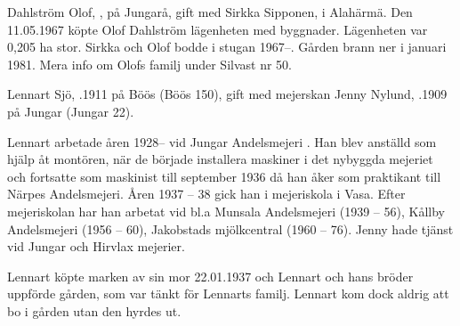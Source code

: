 Dahlström Olof, , på Jungarå, gift med Sirkka Sipponen,  i Alahärmä. Den 11.05.1967 köpte Olof Dahlström lägenheten med byggnader. Lägenheten var 0,205 ha stor. Sirkka och Olof bodde i stugan 1967--. Gården brann ner i januari 1981. Mera info om Olofs familj under Silvast nr 50.


Lennart Sjö, .1911 på Böös (Böös 150), gift med mejerskan Jenny Nylund, .1909 på Jungar (Jungar 22).
\begin{jhchildren}
  \item {}
  \item {}
\end{jhchildren}
Lennart arbetade åren 1928-- vid Jungar Andelsmejeri . Han blev anställd som hjälp åt montören, när de började installera maskiner i det nybyggda mejeriet och fortsatte som maskinist till september 1936 då han åker som praktikant till Närpes Andelsmejeri. Åren 1937 – 38 			gick han i mejeriskola i Vasa. Efter mejeriskolan har han arbetat vid bl.a Munsala Andelsmejeri (1939 – 56), Kållby Andelsmejeri (1956 – 60), Jakobstads mjölkcentral (1960 – 76). Jenny hade tjänst vid Jungar och Hirvlax mejerier.

Lennart köpte marken av sin mor 22.01.1937 och Lennart och hans bröder uppförde gården, som var tänkt för Lennarts familj. Lennart kom dock aldrig att bo i gården utan den hyrdes ut.

